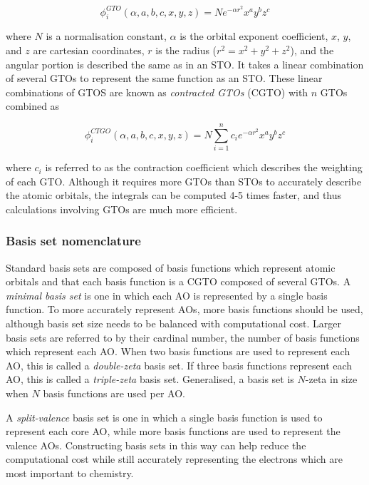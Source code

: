 \begin{equation}
\phi_i^{GTO}(\alpha,a,b,c,x,y,z) = N e^{-\alpha r^2} x^ay^bz^c
\end{equation}

\noindent where $N$ is a normalisation constant, $\alpha$ is the orbital exponent coefficient, $x$, $y$, and $z$ are cartesian coordinates, $r$ is the radius ($r^2=x^2+y^2+z^2$), and the angular portion is described the same as in an STO. It takes a linear combination of several GTOs to represent the same function as an STO. These linear combinations of GTOS are known as \emph{contracted GTOs} (CGTO) with $n$ GTOs combined as

\begin{equation}
\phi_i^{CTGO}(\alpha,a,b,c,x,y,z) = N \sum_{i=1}^n c_i e^{-\alpha r^2} x^ay^bz^c
\end{equation}

\noindent where $c_i$ is referred to as the contraction coefficient which describes the weighting of each GTO. Although it requires more GTOs than STOs to accurately describe the atomic orbitals, the integrals can be computed 4-5 times faster, and thus calculations involving GTOs are much more efficient.\cite{Gill1994}

\subsubsection{Basis set nomenclature}

Standard basis sets are composed of basis functions which represent atomic orbitals and that each basis function is a CGTO composed of several GTOs. A \emph{minimal basis set} is one in which each AO is represented by a single basis function. To more accurately represent AOs, more basis functions should be used, although basis set size needs to be balanced with computational cost. Larger basis sets are referred to by their cardinal number, the number of basis functions which represent each AO. When two basis functions are used to represent each AO, this is called a \emph{double-zeta} basis set. If three basis functions represent each AO, this is called a \emph{triple-zeta} basis set. Generalised, a basis set is $N$-zeta in size when $N$ basis functions are used per AO.

A \emph{split-valence} basis set is one in which a single basis function is used to represent each core AO, while more basis functions are used to represent the valence AOs. Constructing basis sets in this way can help reduce the computational cost while still accurately representing the electrons which are most important to chemistry.


